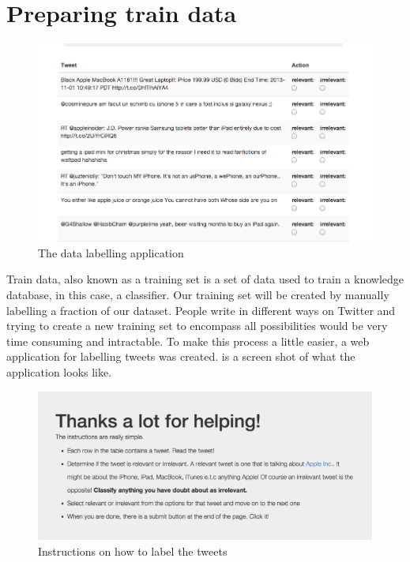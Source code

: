 \section{Preparing train data}
\begin{figure}
  \begin{center}
    \includegraphics[scale=0.6]{Figures/datalabeller}
  \end{center}
  \caption{The data labelling application}
\label{fig:labeller}
\end{figure}

Train data, also known as a training set is a set of data used to train a knowledge database, in
this case, a classifier. Our training set will be created by manually labelling a fraction of our
dataset. People write in different ways on Twitter and trying to create a new training set to
encompass all possibilities would be very time consuming and intractable. To make this process a
little easier, a web application for labelling tweets was created.  is a
screen shot of what the application looks like.

\begin{figure}
  \begin{center}
    \includegraphics[scale=0.4]{Figures/labeller_instructions}
  \end{center}
  \caption{Instructions on how to label the tweets}
\label{fig:labeller-instructions}
\end{figure}

